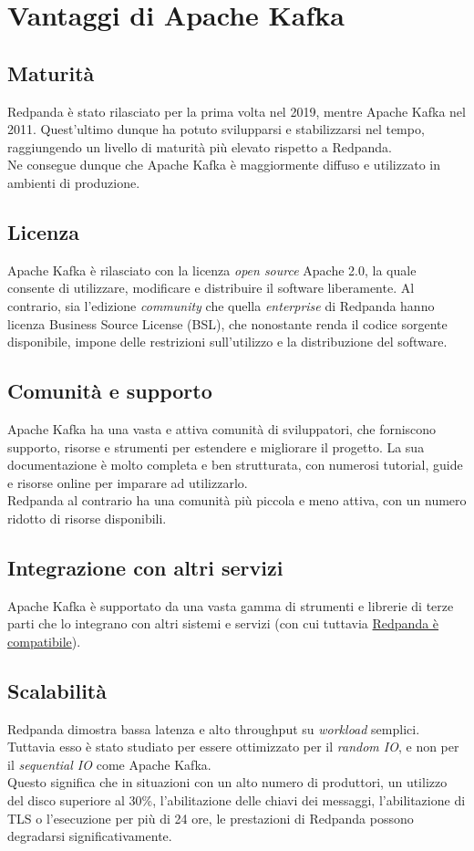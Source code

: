 \section{Vantaggi di Apache Kafka}
\subsection{Maturità}
Redpanda è stato rilasciato per la prima volta nel 2019, mentre Apache Kafka nel 2011.
Quest'ultimo dunque ha potuto svilupparsi e stabilizzarsi nel tempo, raggiungendo
un livello di maturità più elevato rispetto a Redpanda.\\
Ne consegue dunque che Apache Kafka è maggiormente diffuso e utilizzato in ambienti di
produzione.

\subsection{Licenza}
Apache Kafka è rilasciato con la licenza \textit{open source} Apache 2.0, la quale consente di utilizzare, modificare e distribuire il software liberamente.
Al contrario, sia l'edizione \textit{community} che quella \textit{enterprise} di Redpanda hanno licenza Business Source License (BSL), che
nonostante renda il codice sorgente disponibile, impone delle restrizioni sull'utilizzo e la distribuzione del software.


\subsection{Comunità e supporto}
Apache Kafka ha una vasta e attiva comunità di sviluppatori, che forniscono supporto, risorse e strumenti per estendere e migliorare il progetto.
La sua documentazione è molto completa e ben strutturata, con numerosi tutorial, guide e risorse online per imparare ad utilizzarlo.\\
Redpanda al contrario ha una comunità più piccola e meno attiva, con un numero ridotto di risorse disponibili.

\subsection{Integrazione con altri servizi}
Apache Kafka è supportato da una vasta gamma di strumenti e librerie di terze parti che lo integrano con altri sistemi e servizi
(con cui tuttavia \href{https://docs.redpanda.com/current/develop/kafka-clients/}{Redpanda è compatibile}).

\subsection{Scalabilità}
Redpanda dimostra bassa latenza e alto throughput su \textit{workload} semplici. Tuttavia esso è stato studiato per essere ottimizzato per il \textit{random IO}, e non per il \textit{sequential IO} come Apache Kafka.\\
Questo significa che in situazioni con un alto numero di produttori, un utilizzo del disco superiore al 30\%, l'abilitazione delle chiavi dei messaggi, l'abilitazione di TLS o l'esecuzione per più di 24 ore,
le prestazioni di Redpanda possono degradarsi significativamente.\\

